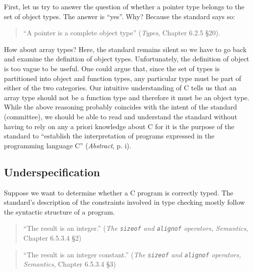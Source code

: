 \documentclass[12pt,a4paper,reqno]{article}
\theoremstyle{plain}
\theoremstyle{definition}
\begin{document}
First, let us try to answer the question of whether a pointer type belongs to the set of object types. The answer is ``yes''. Why? Because the standard says so:
\begin{quote}
``A pointer is a complete object type'' (\textit{Types}, Chapter 6.2.5 §20).
\end{quote}
How about array types? Here, the standard remains silent so we have to go back and examine the definition of object types. Unfortunately, the definition of object is too vague to be useful. One could argue that, since the set of types is partitioned into object and function types, any particular type must be part of either of the two categories. Our intuitive understanding of C tells us that an array type should not be a function type and therefore it must be an object type. While the above reasoning probably coincides with the intent of the standard (committee), we should be able to read and understand the standard without having to rely on any a priori knowledge about C  for it is the purpose of the standard to ``establish the interpretation of programs expressed in the programming language C'' (\textit{Abstract}, p. i).

\subsection{Underspecification}
Suppose we want to determine whether a C program is correctly typed. The standard's description of the constraints involved in type checking mostly follow the syntactic structure of a program.
\begin{quote}
``The result is an integer.'' (\textit{The \texttt{sizeof} and \texttt{alignof} operators, Semantics}, Chapter 6.5.3.4 §2)
\end{quote}
\begin{quote}
``The result is an integer constant.'' (\textit{The \texttt{sizeof} and \texttt{alignof} operators, Semantics}, Chapter 6.5.3.4 §3)
\end{quote}
\end{document}

